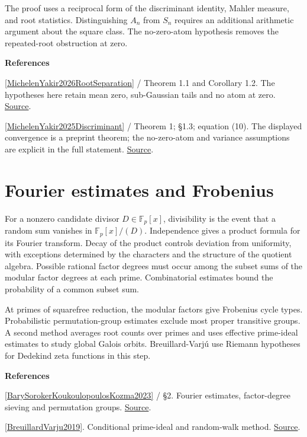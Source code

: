 \documentclass[11pt,a4paper,oneside,openany]{book}
\newcommand{\atlasdisplay}[1]{\par\begingroup\centering\vspace{3pt}\noindent\adjustbox{max width=\linewidth}{\(\displaystyle #1\)}\par\vspace{5pt}\endgroup}
\newenvironment{sources}{\par\smallskip\begingroup\footnotesize\color{atlasgray}\leftskip=10pt\setlength{\parskip}{2pt}}{\par\endgroup\smallskip}
\begin{document}
\atlasdisplay{\frac{\log|\operatorname{disc}(P_n)|-2n\log n}{n}\xrightarrow{\Pr}-D_*,\qquad D_*>0.}
\color{black} The proof uses a reciprocal form of the discriminant identity, Mahler measure, and root statistics. Distinguishing \(A_n\) from \(S_n\) requires an additional arithmetic argument about the square class. The no-zero-atom hypothesis removes the repeated-root obstruction at zero.\par
\begin{sources}
\textbf{References}\par\smallskip
\noindent\hyperlink{ref:MichelenYakir2026RootSeparation}{[MichelenYakir2026RootSeparation]} / Theorem 1.1 and Corollary 1.2. The hypotheses here retain mean zero, sub-Gaussian tails and no atom at zero. \href{https://www.sciencedirect.com/science/article/pii/S0001870826002124}{Source}.\par
\noindent\hyperlink{ref:MichelenYakir2025Discriminant}{[MichelenYakir2025Discriminant]} / Theorem 1; §1.3; equation (10). The displayed convergence is a preprint theorem; the no-zero-atom and variance assumptions are explicit in the full statement. \href{https://arxiv.org/abs/2506.12206}{Source}.\par
\end{sources}\color{black}
\section{Fourier estimates and Frobenius}
\color{black} For a nonzero candidate divisor \(D\in\mathbb F_p[x]\), divisibility is the event that a random sum vanishes in \(\mathbb F_p[x]/(D)\). Independence gives a product formula for its Fourier transform. Decay of the product controls deviation from uniformity, with exceptions determined by the characters and the structure of the quotient algebra. Possible rational factor degrees must occur among the subset sums of the modular factor degrees at each prime. Combinatorial estimates bound the probability of a common subset sum.\par
\color{black} At primes of squarefree reduction, the modular factors give Frobenius cycle types. Probabilistic permutation-group estimates exclude most proper transitive groups. A second method averages root counts over primes and uses effective prime-ideal estimates to study global Galois orbits. Breuillard-Varjú use Riemann hypotheses for Dedekind zeta functions in this step.\par
\begin{sources}
\textbf{References}\par\smallskip
\noindent\hyperlink{ref:BarySorokerKoukoulopoulosKozma2023}{[BarySorokerKoukoulopoulosKozma2023]} / §2. Fourier estimates, factor-degree sieving and permutation groups. \href{https://arxiv.org/abs/2007.14567}{Source}.\par
\noindent\hyperlink{ref:BreuillardVarju2019}{[BreuillardVarju2019]}. Conditional prime-ideal and random-walk method. \href{https://arxiv.org/abs/1810.13360}{Source}.\par
\end{sources}\color{black}
\end{document}

